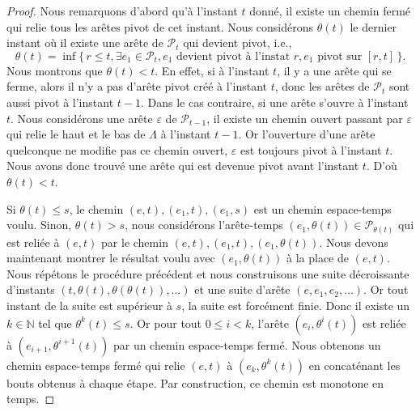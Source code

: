 \documentclass[titlepage,a4paper,12pt]{article}
\begin{document}
\begin{proof}
Nous remarquons d'abord qu'à l'instant $t$ donné, il existe un chemin fermé qui relie tous les arêtes pivot de cet instant. Nous considérons $\theta(t)$ le dernier instant où il existe une arête de $\mathcal{P}_t$ qui devient pivot, i.e.,
$$ \theta(t) = \inf\big\{ \,r\leqslant t, \exists e_1 \in \mathcal{P}_t, e_1 \text{ devient pivot à l'instat } r,e_1\text{ pivot sur }[r,t]\, \big\}.
$$
Nous montrons que $\theta(t)< t$. En effet, si à l'instant $t$, il y a une arête qui se ferme, alors il n'y a pas d'arête pivot créé à l'instant $t$, donc les arêtes de $\mathcal{P}_t$ sont aussi pivot à l'instant $t-1$. Dans le cas contraire, si une arête s'ouvre à l'instant $t$. Nous considérons une arête $\varepsilon$ de $\mathcal{P}_{t-1}$, il existe un chemin ouvert passant par $\varepsilon$ qui relie le haut et le bas de $\Lambda$ à l'instant $t-1$. Or l'ouverture d'une arête quelconque ne modifie pas ce chemin ouvert, $\varepsilon$ est toujours pivot à l'instant $t$. Nous avons donc trouvé une arête qui est devenue pivot avant l'instant $t$. D'où $\theta(t)< t$.

Si $\theta(t)\leqslant s$, le chemin $(e,t),(e_1,t),(e_1,s)$ est un chemin espace-temps voulu. Sinon, $\theta(t)> s$, nous considérons l'arête-temps $(e_1,\theta(t))\in \mathcal{P}_{\theta(t)}$ qui est reliée à $(e,t)$ par le chemin $(e,t),(e_1,t),(e_1,\theta(t))$. Nous devons maintenant montrer le résultat voulu avec $(e_1,\theta(t))$ à la place de $(e,t)$. Nous répétons le procédure précédent et nous construisons une suite décroissante d'instants $(t,\theta(t),\theta(\theta(t)),\dots)$ et une suite d'arête $(e,e_1,e_2,\dots)$. Or tout instant de la suite est supérieur à $s$, la suite est forcément finie. Donc il existe un $k\in\mathbb{N}$ tel que $\theta^k(t)\leqslant s$. Or pour tout $0\leqslant i < k$, l'arête $(e_i,\theta^i(t))$ est reliée à $(e_{i+1},\theta^{i+1}(t))$ par un chemin espace-temps fermé. Nous obtenons un chemin espace-temps fermé qui relie $(e,t)$ à $(e_k,\theta^k(t))$ en concaténant les bouts obtenus à chaque étape. Par construction, ce chemin est monotone en temps. 


\end{proof}
\end{document}
